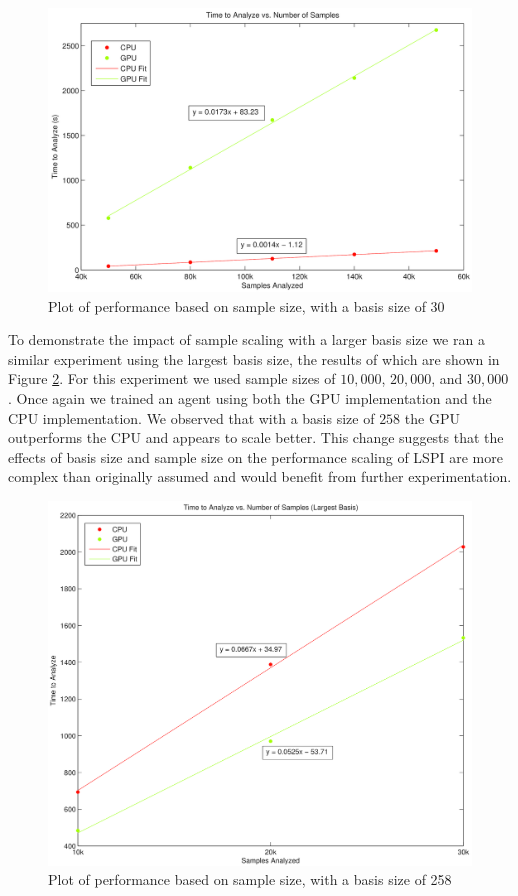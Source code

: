 \begin{figure}
    \centering
	\includegraphics[width=0.6\paperwidth]{Time_vs_Samples.png}
    \caption{Plot of performance based on sample size, with a basis size of 30}
	\label{fig:samples}
\end{figure}

To demonstrate the impact of sample scaling with a larger basis size we ran a similar experiment using the largest basis size, the results of which are shown in Figure \ref{fig:samples:large}. For this experiment we used sample sizes of $10,000$, $20,000$, and $30,000$. Once again we trained an agent using both the GPU implementation and the CPU implementation. We observed that with a basis size of $258$ the GPU outperforms the CPU and appears to scale better. This change suggests that the effects of basis size and sample size on the performance scaling of LSPI are more complex than originally assumed and would benefit from further experimentation.

\begin{figure}%
    \centering
    \includegraphics[height=0.4\paperheight]{Large_Time_vs_Samples.png}%
    \caption{Plot of performance based on sample size, with a basis size of 258}%
    \label{fig:samples:large}%
\end{figure}

